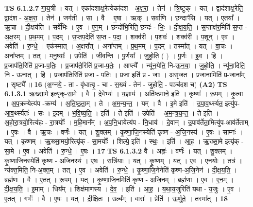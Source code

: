 \documentclass[17pt]{extarticle}
\begin{document}
                  \newline
                                \textbf{ TS 6.1.2.7} \newline
                  गा॒य॒त्री । यत् । एका॑दशाक्ष॒रेत्येका॑दश - अ॒क्ष॒रा॒ । तेन॑ । त्रि॒ष्टुक् । यत् । द्वाद॑शाक्ष॒रेति॒ द्वाद॑श - अ॒क्ष॒रा॒ । तेन॑ । जग॑ती । सा । वै । ए॒षा । ऋक् । सर्वा॑णि । छन्दाꣳ॑सि । यत् । ए॒तया᳚ । ऋ॒चा । दी॒क्षय॑ति । सर्वे॑भिः । ए॒व । ए॒न॒म् । छन्दो॑भि॒रिति॒ छन्दः॑ - भिः॒ । दी॒क्ष॒य॒ति॒ । स॒प्ताक्ष॑र॒मिति॑ स॒प्त - अ॒क्ष॒रम् । प्र॒थ॒मम् । प॒दम् । स॒प्तप॒देति॑ स॒प्त - प॒दा॒ । शक्व॑री । प॒शवः॑ । शक्व॑री । प॒शून् । ए॒व । अवेति॑ । रु॒न्धे॒ । एक॑स्मात् । अ॒क्षरा᳚त् । अना᳚प्तम् । प्र॒थ॒मम् । प॒दम् । तस्मा᳚त् । यत् । वा॒चः । अना᳚प्तम् । तत् । म॒नु॒ष्याः᳚ । उपेति॑ । जी॒व॒न्ति॒ । पू॒र्णया᳚ । जु॒हो॒ति॒ ( ) । पू॒र्णः । इ॒व॒ । हि । प्र॒जाप॑ति॒रिति॑ प्र॒जा-प॒तिः॒ । प्र॒जाप॑ते॒रिति॑ प्र॒जा-प॒तेः॒ । आप्त्यै᳚ । न्यू॑न॒येति॒ नि-ऊ॒न॒या॒ । जु॒हो॒ति॒ । न्यू॑ना॒दिति॒ नि - ऊ॒ना॒त् । हि । प्र॒जाप॑ति॒रिति॑ प्र॒जा - प॒तिः॒ । प्र॒जा इति॑ प्र - जाः । असृ॑जत । प्र॒जाना॒मिति॑ प्र-जाना᳚म् । सृष्ट्यै᳚ ॥ \textbf{  16} \newline
                  \newline
                      (अ॒ग्नये॒ - ता - वृ॑धात्वृ॒ - चा - स॒ख्यं - तेन॑ - जुहोति॒ - पञ्च॑दश च)  \textbf{(A2)} \newline \newline
                                \textbf{ TS 6.1.3.1} \newline
                  ऋ॒ख्सा॒मे इत्यृ॑क्-सा॒मे । वै । दे॒वेभ्यः॑ । य॒ज्ञाय॑ । अति॑ष्ठमाने॒ इति॑ । कृष्णः॑ । रू॒पम् । कृ॒त्वा । अ॒प॒क्रम्येत्य॑प -क्रम्य॑ । अ॒ति॒ष्ठ॒ता॒म् । ते । अ॒म॒न्य॒न्त॒ । यम् । वै । इ॒मे इति॑ । उ॒पा॒व॒र्थ्स्यत॒ इत्यु॑प-आ॒व॒र्थ्स्यतः॑ । सः । इ॒दम् । भ॒वि॒ष्य॒ति॒ । इति॑ । ते इति॑ । उपेति॑ । अ॒म॒न्त्र॒य॒न्त॒ । ते इति॑ । अ॒हो॒रा॒त्रयो॒रित्य॑हः - रा॒त्रयोः᳚ । म॒हि॒मान᳚म् । अ॒प॒नि॒धायेत्य॑प - नि॒धाय॑ । दे॒वान् । उ॒पाव॑र्तेता॒मित्यु॑प-आव॑र्तेताम् । ए॒षः । वै । ऋ॒चः । वर्णः॑ । यत् । शु॒क्लम् । कृ॒ष्णा॒जि॒नस्येति॑ कृष्ण - अ॒जि॒नस्य॑ । ए॒षः । साम्नः॑ । यत् । कृ॒ष्णम् । ऋ॒ख्सा॒मयो॒रित्यृ॑क् - सा॒मयोः᳚ । शिल्पे॒ इति॑ । स्थः॒ । इति॑ । आ॒ह॒ । ऋ॒ख्सा॒मे इत्यृ॑क् - सा॒मे । ए॒व । अवेति॑ । रु॒न्धे॒ । ए॒षः । \textbf{  17} \newline
                  \newline
                                \textbf{ TS 6.1.3.2} \newline
                  वै । अह्नः॑ । वर्णः॑ । यत् । शु॒क्लम् । कृ॒ष्णा॒जि॒नस्येति॑ कृष्ण - अ॒जि॒नस्य॑ । ए॒षः । रात्रि॑याः । यत् । कृ॒ष्णम् । यत् । ए॒व । ए॒न॒योः॒ । तत्र॑ । न्य॑क्त॒मिति॒ नि-अ॒क्त॒म् । तत् । ए॒व । अवेति॑ । रु॒न्धे॒ । कृ॒ष्णा॒जि॒नेनेति॑ कृष्ण-अ॒जि॒नेन॑ । दी॒क्ष॒य॒ति॒ । ब्रह्म॑णः । वै । ए॒तत् । रू॒पम् । यत् । कृ॒ष्णा॒जि॒नमिति॑ कृष्ण - अ॒जि॒नम् । ब्रह्म॑णा । ए॒व । ए॒न॒म् । दी॒क्ष॒य॒ति॒ । इ॒माम् । धिय᳚म् । शिक्ष॑माणस्य । दे॒व॒ । इति॑ । आ॒ह॒ । य॒था॒य॒जुरिति॑ यथा - य॒जुः । ए॒व । ए॒तत् । गर्भः॑ । वै । ए॒षः । यत् । दी॒क्षि॒तः । उल्ब᳚म् । वासः॑ । प्रेति॑ । ऊ॒र्णु॒ते॒ । तस्मा᳚त् । \textbf{  18} \newline
\end{document}
